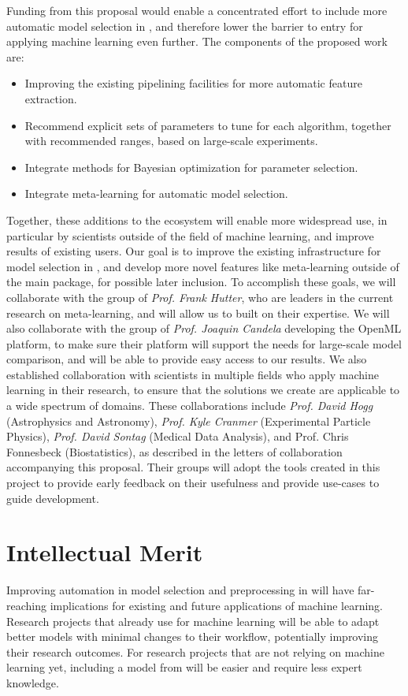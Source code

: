 Funding from this proposal would enable a concentrated effort to include more
automatic model selection in \sklearn{}, and therefore lower the barrier to
entry for applying machine learning even further.
The components of the proposed work are:
\begin{itemize}
    \item Improving the existing pipelining facilities for more automatic feature extraction.
    \item Recommend explicit sets of parameters to tune for each algorithm,
        together with recommended ranges, based on large-scale experiments.
    \item Integrate methods for Bayesian optimization for parameter selection.
    \item Integrate meta-learning for automatic model selection.
\end{itemize}
Together, these additions to the \sklearn{} ecosystem will enable more widespread use,
in particular by scientists outside of the field of machine learning, and improve results
of existing users.
Our goal is to improve the existing infrastructure for model selection in
\sklearn{}, and develop more novel features like meta-learning outside of the main
\sklearn{} package, for possible later inclusion.
To accomplish these goals, we will collaborate with the group of \emph{Prof.
Frank Hutter}, who are leaders in the current research on meta-learning, and
will allow us to built on their expertise.  We will also collaborate with the
group of \emph{Prof. Joaquin Candela} developing the OpenML platform, to make
sure their platform will support the needs for large-scale model comparison,
and will be able to provide easy access to our results.
We also established collaboration with scientists in multiple fields who apply
machine learning in their research, to ensure that the solutions we create are
applicable to a wide spectrum of domains.  These collaborations include
\emph{Prof. David Hogg} (Astrophysics and Astronomy), \emph{Prof. Kyle Cranmer}
(Experimental Particle Physics), \emph{Prof. David Sontag} (Medical Data
Analysis), and Prof. Chris Fonnesbeck (Biostatistics), as described in the
letters of collaboration accompanying this proposal. Their groups will adopt
the tools created in this project to provide early feedback on their usefulness
and provide use-cases to guide development.

\section{Intellectual Merit}
Improving automation in model selection and preprocessing in \sklearn{} will have far-reaching
implications for existing and future applications of machine learning.
Research projects that already use \sklearn{} for machine learning will be able to adapt better
models with minimal changes to their workflow, potentially improving their research outcomes.
For research projects that are not relying on machine learning yet, including a model
from \sklearn{} will be easier and require less expert knowledge.

